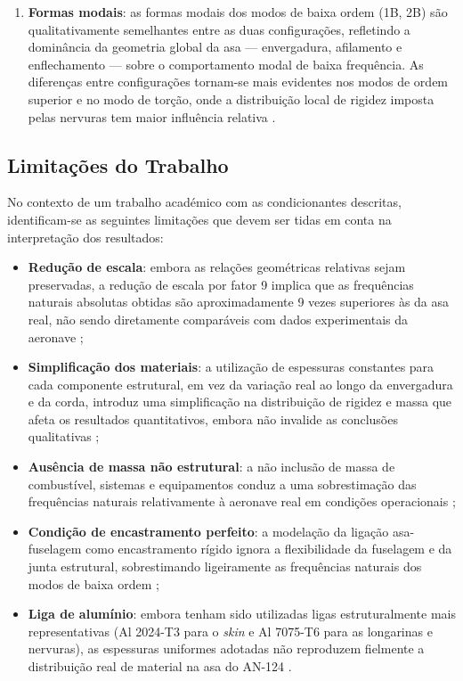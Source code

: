\documentclass[a4paper,fleqn]{cas-sc}
\begin{document}
\begin{enumerate}
    \item \textbf{Formas modais}: as formas modais dos modos de baixa ordem (1B, 2B) são qualitativamente semelhantes entre as duas configurações, refletindo a dominância da geometria global da asa --- envergadura, afilamento e enflechamento --- sobre o comportamento modal de baixa frequência. As diferenças entre configurações tornam-se mais evidentes nos modos de ordem superior e no modo de torção, onde a distribuição local de rigidez imposta pelas nervuras tem maior influência relativa \cite{Bisplinghoff1996, Dowell2004}.
\end{enumerate}

\subsection{Limitações do Trabalho}

No contexto de um trabalho académico com as condicionantes descritas, identificam-se as seguintes limitações que devem ser tidas em conta na interpretação dos resultados:

\begin{itemize}
    \item \textbf{Redução de escala}: embora as relações geométricas relativas sejam preservadas, a redução de escala por fator 9 implica que as frequências naturais absolutas obtidas são aproximadamente 9 vezes superiores às da asa real, não sendo diretamente comparáveis com dados experimentais da aeronave \cite{Craig2006};

    \item \textbf{Simplificação dos materiais}: a utilização de espessuras constantes para cada componente estrutural, em vez da variação real ao longo da envergadura e da corda, introduz uma simplificação na distribuição de rigidez e massa que afeta os resultados quantitativos, embora não invalide as conclusões qualitativas \cite{Megson2012};

    \item \textbf{Ausência de massa não estrutural}: a não inclusão de massa de combustível, sistemas e equipamentos conduz a uma sobrestimação das frequências naturais relativamente à aeronave real em condições operacionais \cite{Wright2015};

    \item \textbf{Condição de encastramento perfeito}: a modelação da ligação asa-fuselagem como encastramento rígido ignora a flexibilidade da fuselagem e da junta estrutural, sobrestimando ligeiramente as frequências naturais dos modos de baixa ordem \cite{Hodges2011};

    \item \textbf{Liga de alumínio}: embora tenham sido utilizadas ligas estruturalmente mais representativas (Al 2024-T3 para o \textit{skin} e Al 7075-T6 para as longarinas e nervuras), as espessuras uniformes adotadas não reproduzem fielmente a distribuição real de material na asa do AN-124 \cite{Megson2012, ASM2008}.
\end{itemize}
\end{document}
